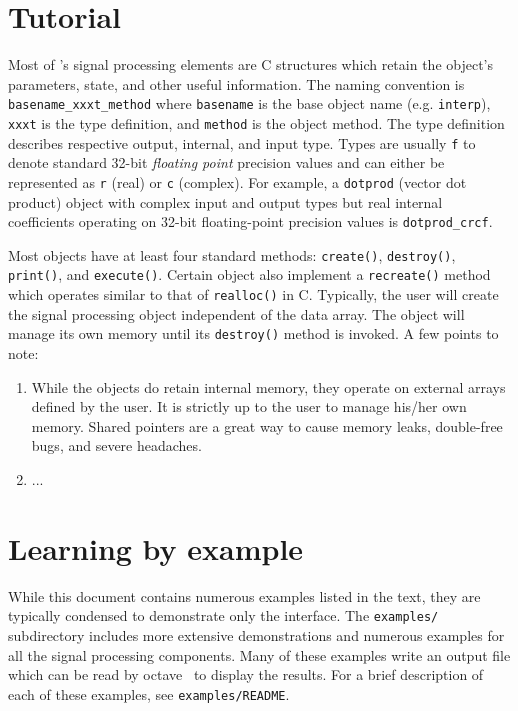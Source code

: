 \section{Tutorial}
Most of \liquid's signal processing elements are C structures which
retain the object's parameters, state, and other useful information.
The naming convention is
{\tt basename\_xxxt\_method} where
{\tt basename} is the base object name (e.g. {\tt interp}),
{\tt xxxt} is the type definition, and
{\tt method} is the object method.
The type definition describes respective output, internal, and input type.
Types are usually {\tt f} to denote standard 32-bit {\it floating point}
precision values and can either be represented as {\tt r} (real) or {\tt c}
(complex).
For example, a {\tt dotprod} (vector dot product) object with complex input
and output types but real internal coefficients operating on 32-bit
floating-point precision values is {\tt dotprod\_crcf}.

Most objects have at least four standard methods:
{\tt create()},
{\tt destroy()},
{\tt print()},
and
{\tt execute()}.
Certain object also implement a {\tt recreate()} method which operates similar
to that of {\tt realloc()} in C.
Typically, the user will create the signal processing object independent of
the data array.
The object will manage its own memory until its {\tt destroy()} method is
invoked.
A few points to note:
\begin{enumerate}
\item While the objects do retain internal memory, they operate on external
      arrays defined by the user.
      It is strictly up to the user to manage his/her own memory.
      Shared pointers are a great way to cause memory leaks, double-free bugs,
      and severe headaches.
\item ...
\end{enumerate}

\section{Learning by example}
While this document contains numerous examples listed in the text, they are
typically condensed to demonstrate only the interface.
The {\tt examples/} subdirectory includes more extensive demonstrations and
numerous examples for all the signal processing components.
Many of these examples write an output file which can be read by
octave~\cite{octave:web} to display the results.
For a brief description of each of these examples, see {\tt examples/README}.

